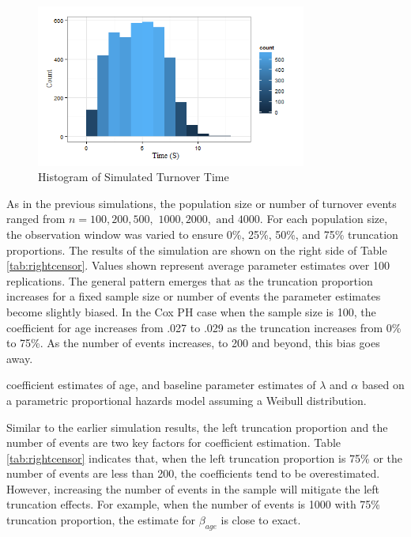 \documentclass[12pt,letterpaper]{article}
\begin{document}
\begin{figure}[htbp]
	\centering
    \includegraphics[width=3.5in]{truncationhist.png}
	\caption{Histogram of Simulated Turnover Time}
 	\label{fig:trunchist}
 \end{figure}

As in the previous simulations, the population size or number of turnover events ranged from $n =100, 200, 500,$ $1000, 2000,$ $\text{and } 4000$.  For each population size, the observation window was varied to ensure 0\%, 25\%, 50\%, and 75\% truncation proportions.  The results of the simulation are shown on the right side of Table \ref{tab:rightcensor}.  Values shown represent average parameter estimates over 100 replications.  The general pattern emerges that as the truncation proportion increases for a fixed sample size or number of events the parameter estimates become slightly biased.  In the Cox PH case when the sample size is 100, the coefficient for age increases from .027 to .029 as the truncation increases from 0\% to 75\%.  As the number of events increases, to 200 and beyond, this bias goes away.

coefficient estimates of age, and baseline parameter estimates of $\lambda$ and $\alpha$ based on a parametric proportional hazards model assuming a Weibull distribution.

Similar to the earlier simulation results, the left truncation proportion and the number of events are two key factors for coefficient estimation. Table \ref{tab:rightcensor} indicates that, when the left truncation proportion is 75\% or the number of events are less than 200, the coefficients tend to be overestimated. However, increasing the number of events in the sample will mitigate the left truncation effects. For example, when the number of events is 1000 with 75\% truncation proportion, the estimate for $\beta_{age}$ is close to exact.
\end{document}
